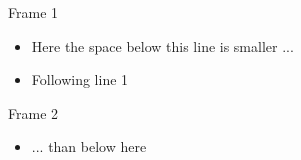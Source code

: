 \documentclass{beamer}
\begin{document}
\begin{frame}{Frame 1}
  \begin{itemize}
    \item Here the space below this line is smaller ...
    \item Following line 1
  \end{itemize}
\end{frame}

\begin{frame}{Frame 2}
  \begin{itemize}
    \item ... than below here
   \end{itemize}
\end{frame}
\end{document}
